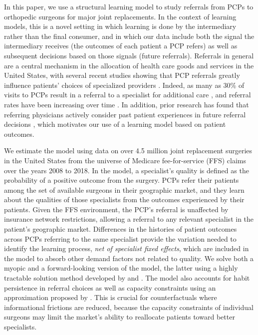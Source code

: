 \documentclass[12pt]{article}
\begin{document}
In this paper, we use a structural learning model to study referrals from PCPs to orthopedic surgeons for major joint replacements. In the context of learning models, this is a novel setting in which learning is done by the intermediary rather than the final consumer, and in which our data include both the signal the intermediary receives (the outcomes of each patient a PCP refers) as well as subsequent decisions based on those signals (future referrals). Referrals in general are a central mechanism in the allocation of health care goods and services in the United States, with several recent studies showing that PCP referrals greatly influence patients' choices of specialized providers \citep*{freedman2015, gaynor2016, barkowski2018, chernew2021}. Indeed, as many as 30\% of visits to PCPs result in a referral to a specialist for additional care \citep{wright2022}, and referral rates have been increasing over time \citep{barnett2012aim, mehrotra2011}. In addition, prior research has found that referring physicians actively consider past patient experiences in future referral decisions \citep*{schneider1996, barnett2012gim}, which motivates our use of a learning model based on patient outcomes. 

We estimate the model using data on over 4.5 million joint replacement surgeries in the United States from the universe of Medicare fee-for-service (FFS) claims over the years 2008 to 2018. In the model, a specialist's quality is defined as the probability of a positive outcome from the surgery. PCPs refer their patients among the set of available surgeons in their geographic market, and they learn about the qualities of those specialists from the outcomes experienced by their patients. Given the FFS environment, the PCP's referral is unaffected by insurance network restrictions, allowing a referral to any relevant specialist in the patient's geographic market. Differences in the histories of patient outcomes across PCPs referring to the same specialist provide the variation needed to identify the learning process, \emph{net of specialist fixed effects}, which are included in the model to absorb other demand factors not related to quality. We solve both a myopic and a forward-looking version of the model, the latter using a highly tractable solution method developed by \cite{gittins1979} and \cite{gittins1979bio}. The model also accounts for habit persistence in referral choices as well as capacity constraints using an approximation proposed by \cite*{richards-shubik2021}. This is crucial for counterfactuals where informational frictions are reduced, because the capacity constraints of individual surgeons may limit the market's ability to reallocate patients toward better specialists.
\end{document}
